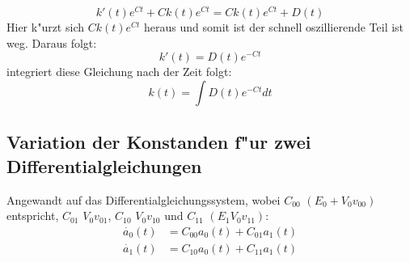 \begin{refsection}
\[
k'(t) e^{C t} + C k(t) e^{C t} = C k(t) e^{C t} + D(t)
\] 
Hier k"urzt sich $ C k(t) e^{C t} $ heraus und somit ist der schnell
oszillierende Teil ist weg.
Daraus folgt:
\[
k'(t) = D(t) e^{-C t}
\] 
integriert diese Gleichung nach der Zeit folgt:
\[
k(t) = \int D(t) e^{-C t} dt 
\]

\subsection{Variation der Konstanden f"ur zwei Differentialgleichungen}
Angewandt auf das Differentialgleichungssystem,
wobei $C_{00}$ $(E_{0} + V_{0} v_{00})$
entspricht,
$C_{01}$ $V_{0} v_{01}$,
$C_{10}$ $V_{0} v_{10}$ und $C_{11}$ $(E_{1} V_{0} v_{11})$:
\begin{align*}
\dot{a_{0}}(t) &= C_{00}a_{0}(t) + C_{01}a_{1}(t)
\\
\dot{a_{1}}(t) &= C_{10}a_{0}(t) + C_{11}a_{1}(t)
\end{align*}


\end{refsection}
